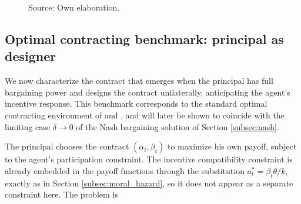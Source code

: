 \documentclass{article}
\theoremstyle{definition}
\theoremstyle{plain}
\begin{document}
\begin{figure}[H]
\centering
\caption{Total surplus $S(\beta_t)$ as a function of the incentive slope under moral hazard. The curve peaks at $\beta^{\text{eff}} \in (0,1)$; the gap to $S^{\text{FB}}$ is the efficiency loss from the risk-incentive trade-off.}
\caption*{Source: Own elaboration.}
\label{fig:surplus_curve}
\end{figure}
\vspace{-0.1cm}

\subsection{Optimal contracting benchmark: principal as designer}\label{subsec:variante_B}

We now characterize the contract that emerges when the principal has full bargaining power and designs the contract unilaterally, anticipating the agent's incentive response. This benchmark corresponds to the standard optimal contracting environment of \textcite{holmstrom1979} and \textcite{holmstrom1987}, and will later be shown to coincide with the limiting case $\delta \to 0$ of the Nash bargaining solution of Section \ref{subsec:nash}.

The principal chooses the contract $(\alpha_t, \beta_t)$ to maximize his own payoff, subject to the agent's participation constraint. The incentive compatibility constraint is already embedded in the payoff functions through the substitution $a_t^* = \beta_t\theta/k$, exactly as in Section \ref{subsec:moral_hazard}, so it does not appear as a separate constraint here. The problem is
\end{document}
